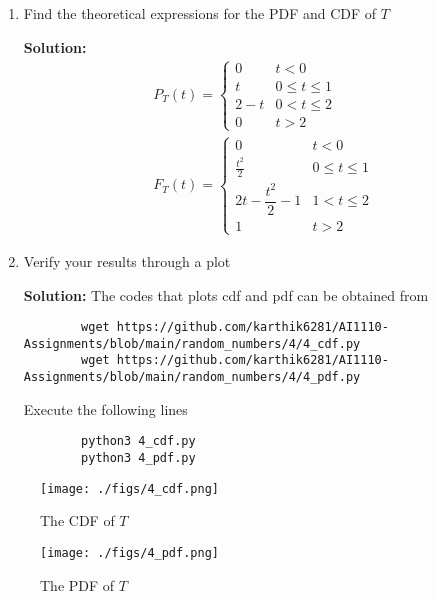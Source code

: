 \documentclass[journal,12pt,twocolumn]{IEEEtran}
\newcommand{\solution}{\noindent \textbf{Solution: }}
\numberwithin{equation}{section}
\renewcommand\thesection{\arabic{section}}
\begin{document}
\begin{enumerate}[label=\thesection.\arabic*,ref=\thesection.\theenumi]
\begin{enumerate}[label=\thesection.\arabic*,ref=\thesection.\theenumi]
	\item Find the theoretical expressions for the PDF and CDF of $T$
	
	\solution 
\begin{align}
P_{T}(t)=
\begin{cases}
0 & t<0\\
t & 0\leq t \leq 1\\
2-t  & 0< t \leq 2\\
0 & t>2 
\end{cases} 
\\   
F_{T}(t)=
\begin{cases}
0 & t<0\\
\frac{t^2}{2} & 0\leq t \leq 1\\
2t -\dfrac{t^2}{2} - 1  & 1< t \leq 2\\
1 & t>2
\end{cases}
\end{align}
	\item Verify your results through a plot
	
	\solution The codes that plots cdf and pdf can be obtained from
	\begin{lstlisting}
		wget https://github.com/karthik6281/AI1110-Assignments/blob/main/random_numbers/4/4_cdf.py
		wget https://github.com/karthik6281/AI1110-Assignments/blob/main/random_numbers/4/4_pdf.py
	\end{lstlisting}
	Execute the following lines
	\begin{lstlisting}
		python3 4_cdf.py
		python3 4_pdf.py
	\end{lstlisting}
	
	
	\end{enumerate}
	
	\begin{figure}
		\centering
		\texttt{[image: ./figs/4\_cdf.png]}
		\caption{The CDF of $T$}
	\end{figure}
	
	\begin{figure}
		\centering
		\texttt{[image: ./figs/4\_pdf.png]}
		\caption{The PDF of $T$}
	\end{figure}		
	
\end{enumerate}
\end{document}
